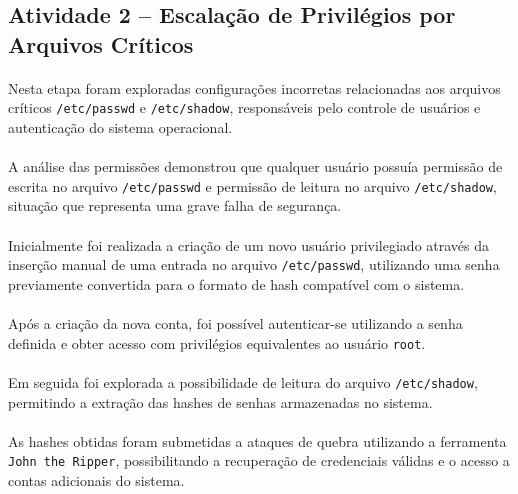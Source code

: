 \subsection{Atividade 2 -- Escalação de Privilégios por Arquivos Críticos}

\paragraph{}
Nesta etapa foram exploradas configurações incorretas relacionadas aos arquivos
críticos \texttt{/etc/passwd} e \texttt{/etc/shadow}, responsáveis pelo controle
de usuários e autenticação do sistema operacional.

\paragraph{}
A análise das permissões demonstrou que qualquer usuário possuía permissão de
escrita no arquivo \texttt{/etc/passwd} e permissão de leitura no arquivo
\texttt{/etc/shadow}, situação que representa uma grave falha de segurança.

\paragraph{}
Inicialmente foi realizada a criação de um novo usuário privilegiado através da
inserção manual de uma entrada no arquivo \texttt{/etc/passwd}, utilizando uma
senha previamente convertida para o formato de hash compatível com o sistema.

\paragraph{}
Após a criação da nova conta, foi possível autenticar-se utilizando a senha
definida e obter acesso com privilégios equivalentes ao usuário
\texttt{root}.

\paragraph{}
Em seguida foi explorada a possibilidade de leitura do arquivo
\texttt{/etc/shadow}, permitindo a extração das hashes de senhas armazenadas no
sistema.

\paragraph{}
As hashes obtidas foram submetidas a ataques de quebra utilizando a ferramenta
\texttt{John the Ripper}, possibilitando a recuperação de credenciais válidas e
o acesso a contas adicionais do sistema.

